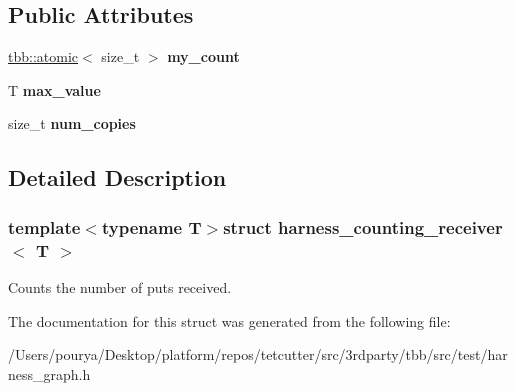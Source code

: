 \subsection*{Public Attributes}
\begin{DoxyCompactItemize}
\item 
\hypertarget{structharness__counting__receiver_aeaa4eb5eb283464012ef33d88ba8cb90}{}\hyperlink{structtbb_1_1atomic}{tbb\+::atomic}$<$ size\+\_\+t $>$ {\bfseries my\+\_\+count}\label{structharness__counting__receiver_aeaa4eb5eb283464012ef33d88ba8cb90}

\item 
\hypertarget{structharness__counting__receiver_ab51cf44f7d0ad3547070ee4445ea3691}{}T {\bfseries max\+\_\+value}\label{structharness__counting__receiver_ab51cf44f7d0ad3547070ee4445ea3691}

\item 
\hypertarget{structharness__counting__receiver_ab94707bbd76e04d1d9fab79bc12bfebc}{}size\+\_\+t {\bfseries num\+\_\+copies}\label{structharness__counting__receiver_ab94707bbd76e04d1d9fab79bc12bfebc}

\end{DoxyCompactItemize}


\subsection{Detailed Description}
\subsubsection*{template$<$typename T$>$struct harness\+\_\+counting\+\_\+receiver$<$ T $>$}

Counts the number of puts received. 

The documentation for this struct was generated from the following file\+:\begin{DoxyCompactItemize}
\item 
/\+Users/pourya/\+Desktop/platform/repos/tetcutter/src/3rdparty/tbb/src/test/harness\+\_\+graph.\+h\end{DoxyCompactItemize}
